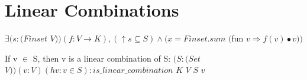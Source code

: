 \section{Linear Combinations}

\begin{definition}
  \label{definition : linear_combination}
  \leanok
  $\exists (s : (Finset$ $V)) (f : V → K), (↑s ⊆ S) ∧ (x = Finset.sum$ $($fun $v \Rightarrow f (v) \bullet v))$
\end{definition}

\begin{theorem}
  \label{theorem : linear_combination_of_mem}
  \leanok
  If v $\in$ S, then v is a linear combination of S: $(S : (Set$ $V)) (v : V) (hv : v \in S) : is\_linear\_combination$ $K$ $V$ $S$ $v$
\end{theorem}

